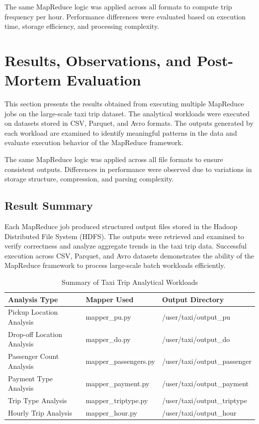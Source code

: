 \documentclass[12pt,a4paper]{report}
\begin{document}
The same MapReduce logic was applied across all formats to compute trip frequency
per hour. Performance differences were evaluated based on execution time,
storage efficiency, and processing complexity.

\clearpage

\section{Results, Observations, and Post-Mortem Evaluation}

This section presents the results obtained from executing multiple MapReduce jobs on
the large-scale taxi trip dataset. The analytical workloads were executed on datasets
stored in CSV, Parquet, and Avro formats. The outputs generated by each workload are
examined to identify meaningful patterns in the data and evaluate execution behavior of
the MapReduce framework.

The same MapReduce logic was applied across all file formats to ensure consistent
outputs. Differences in performance were observed due to variations in storage structure,
compression, and parsing complexity.


\subsection{Result Summary}

Each MapReduce job produced structured output files stored in the Hadoop Distributed
File System (HDFS). The outputs were retrieved and examined to verify correctness and
analyze aggregate trends in the taxi trip data. Successful execution across CSV,
Parquet, and Avro datasets demonstrates the ability of the MapReduce framework to
process large-scale batch workloads efficiently.

\begin{table}[h]
\centering
\caption{Summary of Taxi Trip Analytical Workloads}
\begin{tabular}{|l|l|l|}
\hline
\textbf{Analysis Type} & \textbf{Mapper Used} & \textbf{Output Directory} \\
\hline
Pickup Location Analysis & mapper\_pu.py & /user/taxi/output\_pu \\
Drop-off Location Analysis & mapper\_do.py & /user/taxi/output\_do \\
Passenger Count Analysis & mapper\_passengers.py & /user/taxi/output\_passenger \\
Payment Type Analysis & mapper\_payment.py & /user/taxi/output\_payment \\
Trip Type Analysis & mapper\_triptype.py & /user/taxi/output\_triptype \\
Hourly Trip Analysis & mapper\_hour.py & /user/taxi/output\_hour \\
\hline
\end{tabular}
\end{table}
\end{document}
